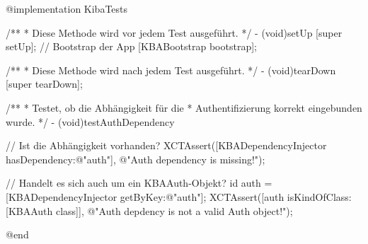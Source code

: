 @implementation KibaTests

/**
 *  Diese Methode wird vor jedem Test ausgeführt.
 */
- (void)setUp
{
    [super setUp];
    // Bootstrap der App
    [KBABootstrap bootstrap];
}

/**
 *  Diese Methode wird nach jedem Test ausgeführt.
 */
- (void)tearDown
{
    [super tearDown];
}

/**
 *  Testet, ob die Abhängigkeit für die
 *  Authentifizierung korrekt eingebunden wurde.
 */
- (void)testAuthDependency
{
	// Ist die Abhängigkeit vorhanden?
    XCTAssert([KBADependencyInjector hasDependency:@"auth"],
              @"Auth dependency is missing!");
              
    // Handelt es sich auch um ein KBAAuth-Objekt?
    id auth = [KBADependencyInjector getByKey:@"auth"];
    XCTAssert([auth isKindOfClass:[KBAAuth class]],
              @"Auth depdency is not a valid Auth object!");
}

@end
